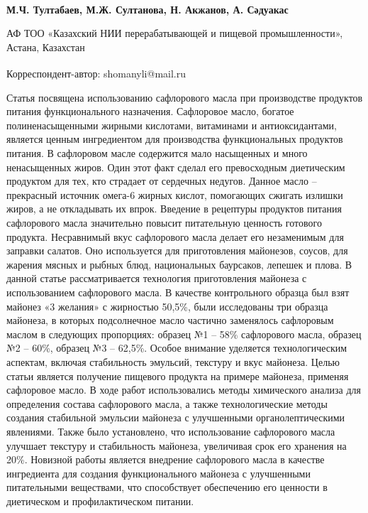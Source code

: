 
\begin{articleheader}

{\bfseries
М.Ч. Тултабаев\textsuperscript{\envelope },
М.Ж. Султанова,
Н. Акжанов,
А. Сәдуакас
}
\end{articleheader}

\begin{affiliation}
АФ ТОО «Казахский НИИ перерабатывающей и пищевой промышленности», Астана, Казахстан

\raggedright \textsuperscript{\envelope }Корреспондент-автор: shomanyli@mail.ru
\end{affiliation}

Статья посвящена использованию сафлорового масла при производстве
продуктов питания функционального назначения. Сафлоровое масло, богатое
полиненасыщенными жирными кислотами, витаминами и антиоксидантами,
является ценным ингредиентом для производства функциональных продуктов
питания. В сафлоровом масле содержится мало насыщенных и много
ненасыщенных жиров. Один этот факт сделал его превосходным диетическим
продуктом для тех, кто страдает от сердечных недугов. Данное масло --
прекрасный источник омега-6 жирных кислот, помогающих сжигать излишки
жиров, а не откладывать их впрок. Введение в рецептуры продуктов питания
сафлорового масла значительно повысит питательную ценность готового
продукта. Несравнимый вкус сафлорового масла делает его незаменимым для
заправки салатов. Оно используется для приготовления майонезов, соусов,
для жарения мясных и рыбных блюд, национальных баурсаков, лепешек и
плова. В данной статье рассматривается технология приготовления майонеза
с использованием сафлорового масла. В качестве контрольного образца был
взят майонез «3 желания» с жирностью 50,5\%, были исследованы три
образца майонеза, в которых подсолнечное масло частично заменялось
сафлоровым маслом в следующих пропорциях: образец №1 -- 58\% сафлорового
масла, образец №2 -- 60\%, образец №3 -- 62,5\%. Особое внимание
уделяется технологическим аспектам, включая стабильность эмульсий,
текстуру и вкус майонеза. Целью статьи является получение пищевого
продукта на примере майонеза, применяя сафлоровое масло. В ходе работ
использовались методы химического анализа для определения состава
сафлорового масла, а также технологические методы создания стабильной
эмульсии майонеза с улучшенными органолептическими явлениями. Также было
установлено, что использование сафлорового масла улучшает текстуру и
стабильность майонеза, увеличивая срок его хранения на 20\%. Новизной
работы является внедрение сафлорового масла в качестве ингредиента для
создания функционального майонеза с улучшенными питательными веществами,
что способствует обеспечению его ценности в диетическом и
профилактическом питании.

